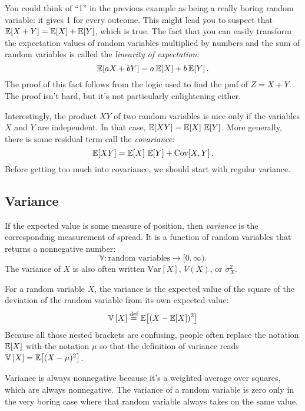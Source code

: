 You could think of ``1'' in the previous example as being a really boring
random variable: it gives 1 for every outcome. This might lead you to suspect
that $\mathbb{E}\!\left[{X + Y}\right] = \mathbb{E}\!\left[{X}\right] + \mathbb{E}\!\left[{Y}\right]$, which is true. The fact that
you can easily transform the expectation values of random variables multiplied by
numbers and the sum of random variables is called the \emph{linearity of expectation}:
\begin{equation}
\mathbb{E}\!\left[{aX + bY}\right] = a \,\mathbb{E}\!\left[{X}\right] + b \,\mathbb{E}\!\left[{Y}\right].
\end{equation}
The proof of this fact follows from the logic used to find the pmf of $Z = X +
Y$. The proof isn't hard, but it's not particularly enlightening either.

Interestingly, the product $XY$ of two random variables is nice only if the
variables $X$ and $Y$ are independent. In that case, $\mathbb{E}\!\left[{XY}\right] = \mathbb{E}\!\left[{X}\right]\,\mathbb{E}\!\left[{Y}\right]$.
More generally, there is some residual term call the \emph{covariance}:
\begin{equation}
\mathbb{E}\!\left[{XY}\right] = \mathbb{E}\!\left[{X}\right] \, \mathbb{E}\!\left[{Y}\right] + \mathrm{Cov}\!\left[{X, Y}\right].
\end{equation}
Before getting too much into covariance, we should start with regular variance.

\subsection{Variance}

If the expected value is some measure of position, then \emph{variance} is the
corresponding measurement of spread. It is a function of random variables that
returns a nonnegative number:
\begin{equation*}
\mathbb{V} : \text{random variables} \to [0, \infty).
\end{equation*}
The variance of $X$ is also often written $\mathrm{Var}[X]$, $V(X)$, or $\sigma^2_X$.

For a random variable $X$, the variance is the expected value of the square of
the deviation of the random variable from its own expected value:
\begin{equation*}
\mathbb{V}\left[{X}\right] \stackrel{\text{def}}{=} \mathbb{E}\!\left[{(X - \mathbb{E}\!\left[{X}\right])^2}\right]
\end{equation*}
Because all those nested brackets are confusing, people often replace the
notation $\mathbb{E}\!\left[{X}\right]$ with the notation $\mu$ so that the definition of
variance reads $\mathbb{V}\left[{X}\right] = \mathbb{E}\!\left[{(X - \mu)^2}\right]$.

Variance is always nonnegative because it's a weighted average over squares,
which are always nonnegative. The variance of a random variable is zero only
in the very boring case where that random variable always takes on the same
value.

